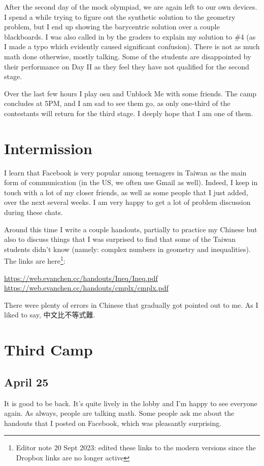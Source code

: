 \documentclass[11pt]{scrreprt}
\begin{document}
After the second day of the mock olympiad, we are again left to our own devices.
I spend a while trying to figure out the synthetic solution to the geometry problem,
but I end up showing the barycentric solution over a couple blackboards.
I was also called in by the graders to explain my solution to \#4 (as I made a
typo which evidently caused significant confusion). There is not as much math done otherwise, mostly talking.
Some of the students are disappointed by their performance on Day II as they
feel they have not qualified for the second stage.

Over the last few hours I play osu and Unblock Me with some friends.
The camp concludes at 5PM, and I am sad to see them go,
as only one-third of the contestants will return for the third stage. I deeply hope that I am one of them.


\section{Intermission}
I learn that Facebook is very popular among teenagers in Taiwan as the main form of communication (in the US,
we often use Gmail as well).
Indeed, I keep in touch with a lot of my closer friends, as well as some people that I just added,
over the next several weeks.
I am very happy to get a lot of problem discussion during these chats.

Around this time I write a couple handouts,
partially to practice my Chinese but also to discuss things that I was surprised
to find that some of the Taiwan students didn't know (namely: complex numbers in geometry and inequalities).
The links are here\footnote{Editor note 20 Sept 2023: edited these links to the modern
  versions since the Dropbox links are no longer active}:
\begin{itemize}
  \ii \url{https://web.evanchen.cc/handouts/Ineq/Ineq.pdf}
  \ii \url{https://web.evanchen.cc/handouts/cmplx/cmplx.pdf}
\end{itemize}
There were plenty of errors in Chinese that gradually got pointed out to me. As I liked to say, 中文比不等式難.

\section{Third Camp}
\subsection{April 25}
It is good to be back. It's quite lively in the lobby and I'm happy to see everyone again.
As always, people are talking math.
Some people ask me about the handouts that I posted on Facebook, which was pleasantly surprising.
\end{document}
